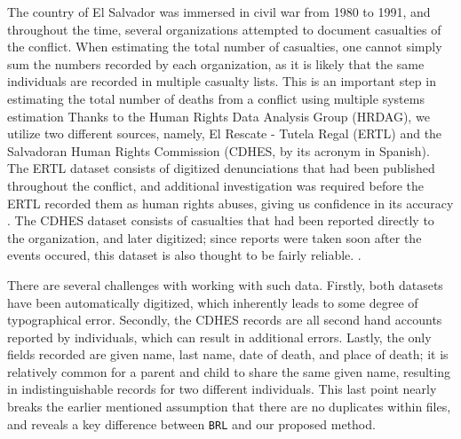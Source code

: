 \documentclass[12pt,letterpaper]{article}
\newcommand{\1}[1]{\mathbb{I}\!\left[#1\right]} %
\begin{document}
The country of El Salvador was immersed in civil war from 1980 to 1991,
and throughout the time, several organizations attempted to document
casualties of the conflict. When estimating the total number of
casualties, one cannot simply sum the numbers recorded by each
organization, as it is likely that the same individuals are recorded in
multiple casualty lists. This is an important step in estimating the total number of deaths from a conflict using multiple systems estimation \citep{lum2013applications} Thanks to the Human Rights Data Analysis Group (HRDAG), we utilize 
two different sources, namely,  El Rescate - Tutela
Regal (ERTL) and the Salvadoran Human Rights Commission (CDHES, by its
acronym in Spanish). The ERTL dataset consists of digitized denunciations that
had been published throughout the conflict, and additional investigation was required before the ERTL recorded them as human rights abuses, giving us confidence in its accuracy \cite{howland2008rescate}. The CDHES dataset consists
of casualties that had been reported directly to the organization, and
later digitized; since reports were taken soon after the events occured, this dataset is also thought to be fairly reliable. \cite{ball2000salvadoran}.

There are several challenges with working with such data. Firstly, both
datasets have been automatically digitized, which inherently leads to
some degree of typographical error. Secondly, the CDHES records are all
second hand accounts reported by individuals, which can result in
additional errors. Lastly, the only fields recorded are given name, last
name, date of death, and place of death; it is relatively common for a
parent and child to share the same given name, resulting in
indistinguishable records for two different individuals. This last point
nearly breaks the earlier mentioned assumption that there are no
duplicates within files, and reveals a key difference between
\texttt{BRL} and our proposed method.
\end{document}
